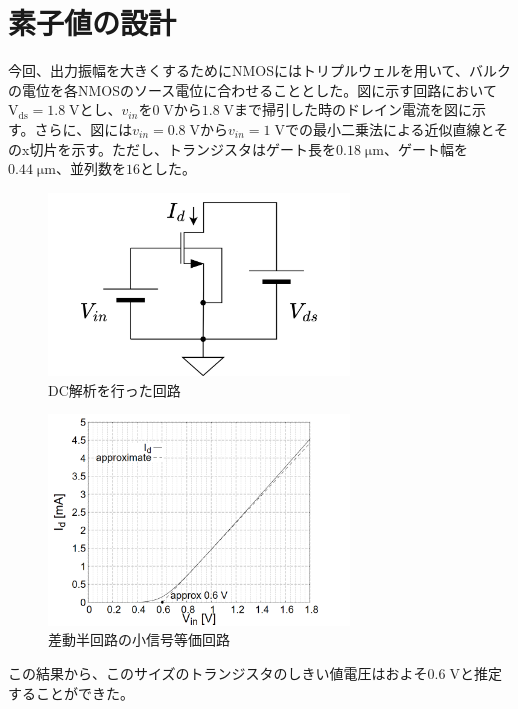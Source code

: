 \documentclass[twocolumn]{jsarticle}
\begin{document}
\section{素子値の設計}
    今回、出力振幅を大きくするためにNMOSにはトリプルウェルを用いて、バルクの電位を各NMOSのソース電位に合わせることとした。図に示す回路において$\mathrm{V_{ds}}=1.8\;\mathrm{V}$とし、$v_{in}$を$0\;\mathrm{V}$から$1.8\;\mathrm{V}$まで掃引した時のドレイン電流を図に示す。さらに、図には$v_{in}=0.8\;\mathrm{V}$から$v_{in}=1\;\mathrm{V}$での最小二乗法による近似直線とそのx切片を示す。ただし、トランジスタはゲート長を$0.18\;\mathrm{\mu m}$、ゲート幅を$0.44\;\mathrm{\mu m}$、並列数を$16$とした。
    \begin{figure}[H]
        \begin{center}
            \includegraphics*[width = 80mm]{figures/nmos_unit_circuit.png}
            \caption{DC解析を行った回路}
            \label{fig:nmos_unit_circuit}
        \end{center}
    \end{figure}
    \begin{figure}[H]
        \begin{center}
            \includegraphics*[width = 80mm]{figures/nmos_unit.PNG}
            \caption{差動半回路の小信号等価回路}
            \label{fig:nmos_unit}
        \end{center}
    \end{figure}
    この結果から、このサイズのトランジスタのしきい値電圧はおよそ$0.6\;\mathrm{V}$と推定することができた。
\end{document}
